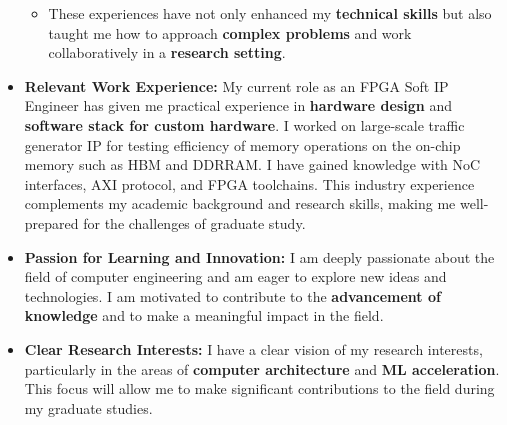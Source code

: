 \documentclass[a4 paper, 10pt]{article}
\begin{document}
\begin{itemize}
\begin{itemize}
		\item These experiences have not only enhanced my \textbf{technical skills} but also taught me how to approach \textbf{complex problems} and work collaboratively in a \textbf{research setting}.
	\end{itemize}
	\label{Altera}
    \item \textbf{Relevant Work Experience:} My current role as an {FPGA Soft IP Engineer} has given me practical experience in \textbf{hardware design} and \textbf{software stack for custom hardware}. I worked on large-scale traffic generator IP for testing efficiency of memory operations on the on-chip memory such as HBM and DDRRAM. I have gained knowledge with NoC interfaces, AXI protocol, and FPGA toolchains. This industry experience complements my {academic background} and {research skills}, making me well-prepared for the challenges of graduate study.
    \item \textbf{Passion for Learning and Innovation:} I am deeply passionate about the field of {computer engineering} and am eager to explore {new ideas and technologies}. I am motivated to contribute to the \textbf{advancement of knowledge} and to make a meaningful impact in the field.
    \item \textbf{Clear Research Interests:} I have a clear vision of my research interests, particularly in the areas of \textbf{computer architecture} and \textbf{ML acceleration}. This focus will allow me to make significant contributions to the field during my graduate studies.
\end{itemize}
\end{document}
